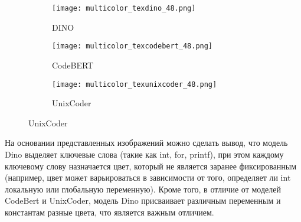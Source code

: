 \documentclass[../part_3.tex]{subfiles}
\begin{document}
\begin{figure}[H]
    \centering
    \begin{subfigure}{.32\textwidth}
        \centering
        \texttt{[image: multicolor\_texdino\_48.png]}
        \caption{DINO}
    \end{subfigure}
    \hfill
    \begin{subfigure}{.32\textwidth}
        \centering
        \texttt{[image: multicolor\_texcodebert\_48.png]}
        \caption{CodeBERT}
    \end{subfigure}
    \hfill
    \begin{subfigure}{.32\textwidth}
        \centering
        \texttt{[image: multicolor\_texunixcoder\_48.png]}  
        \caption{UnixCoder}
    \end{subfigure}
    \vspace{1cm}
\end{figure}
\par На основании представленных изображений можно сделать вывод, что модель Dino выделяет ключевые слова (такие как int, for, printf), при этом каждому ключевому слову назначается цвет, который не является заранее фиксированным (например, цвет может варьироваться в зависимости от того, определяет ли int локальную или глобальную переменную). Кроме того, в отличие от моделей CodeBert и UnixCoder, модель Dino присваивает различным переменным и константам разные цвета, что является важным отличием.
\end{document}
